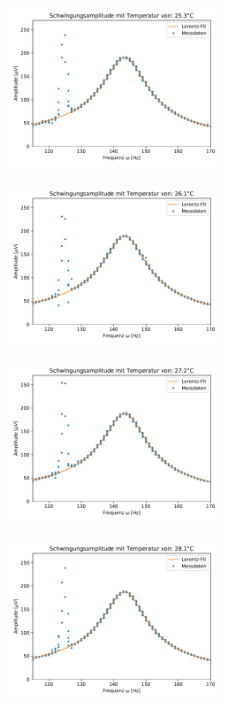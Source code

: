 \documentclass{article}
\begin{document}
\begin{figure}
\centering
\includegraphics[width=0.5\textwidth]{Resonanz140_temp1.pdf}
\end{figure}
\begin{figure}
\centering
\includegraphics[width=0.5\textwidth]{Resonanz140_temp2.pdf}
\end{figure}
\begin{figure}
\centering
\includegraphics[width=0.5\textwidth]{Resonanz140_temp3.pdf}
\end{figure}
\begin{figure}
\centering
\includegraphics[width=0.5\textwidth]{Resonanz140_temp4.pdf}
\end{figure}
\end{document}
